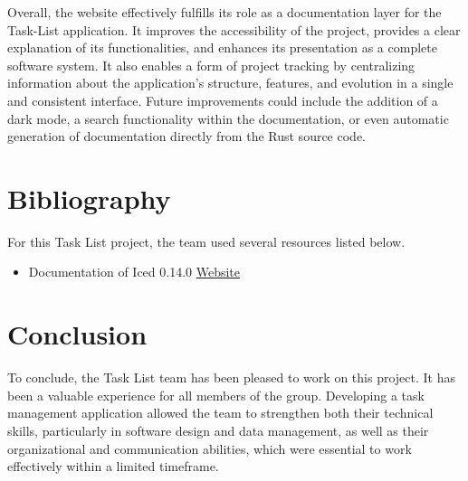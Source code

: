 \documentclass{article}
\begin{document}
Overall, the website effectively fulfills its role as a documentation layer for the Task-List application. It improves the accessibility of the project, provides a clear explanation of its functionalities, and enhances its presentation as a complete software system. It also enables a form of project tracking by centralizing information about the application’s structure, features, and evolution in a single and consistent interface. Future improvements could include the addition of a dark mode, a search functionality within the documentation, or even automatic generation of documentation directly from the Rust source code.





\section{Bibliography}
For this Task List project, the team used several resources listed below.
\begin{itemize}
    \item Documentation of Iced 0.14.0 \url{Website}
\end{itemize}





\newpage
\section{Conclusion}
To conclude, the Task List team has been pleased to work on this project. It has been a valuable experience for all members of the group. Developing a task management application allowed the team to strengthen both their technical skills, particularly in software design and data management, as well as their organizational and communication abilities, which were essential to work effectively within a limited timeframe.
\end{document}
